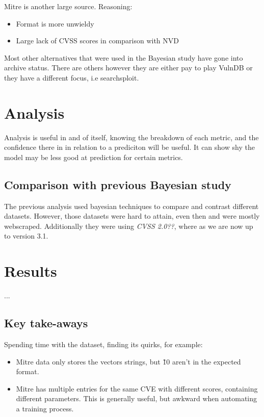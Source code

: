 \documentclass[11pt]{article}
\begin{document}
Mitre is another large source.
Reasoning:
\begin{itemize}
	\item Format is more unwieldy
	\item Large lack of CVSS scores in comparison with NVD
\end{itemize}

Most other alternatives that were used in the Bayesian study have gone into archive status. There
are others however they are either pay to play VulnDB or they have a different focus, i.e
searchsploit.

\section{Analysis}

Analysis is useful in and of itself, knowing the breakdown of each metric, and the confidence there
in in relation to a prediciton will be useful. It can show shy the model may be less good at
prediction for certain metrics.

\subsection{Comparison with previous Bayesian study}

The previous analysis used bayesian techniques to compare and contrast different datasets. However,
those datasets were hard to attain, even then and were mostly webscraped. Additionally they were
using \textit{CVSS 2.0??}, where as we are now up to version 3.1.

\section{Results}
...


\subsection{Key take-aways}

Spending time with the dataset, finding its quirks, for example:

\begin{itemize}
	\item Mitre data only stores the vectors strings, but \~10 aren't in the expected format.
	\item Mitre has multiple entries for the same CVE with different scores, containing different
	      parameters. This is generally useful, but awkward when automating a training process.
\end{itemize}
\end{document}
